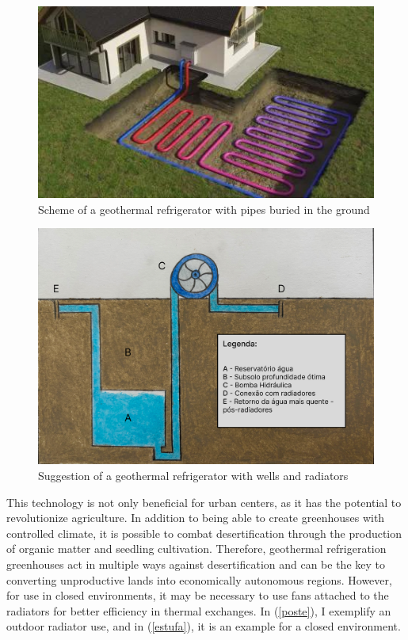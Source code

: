 \begin{figure}[ht]
    \centering
    \includegraphics[scale=0.7]{pictures/geoterma-padrao.jpeg}
    \caption{Scheme of a geothermal refrigerator with pipes buried in the ground}
    \label{geothermal-default}
\end{figure}

\begin{figure}[ht]
    \centering
    \includegraphics[scale=0.25]{pictures/geoterma.png}
    \caption{Suggestion of a geothermal refrigerator with wells and radiators}
    \label{geothermal-new}
\end{figure}

This technology is not only beneficial for urban centers, as it has the potential to revolutionize agriculture. In addition to being able to create greenhouses with controlled climate, it is possible to combat desertification through the production of organic matter and seedling cultivation. Therefore, geothermal refrigeration greenhouses act in multiple ways against desertification and can be the key to converting unproductive lands into economically autonomous regions. However, for use in closed environments, it may be necessary to use fans attached to the radiators for better efficiency in thermal exchanges. In (\autoref{poste}), I exemplify an outdoor radiator use, and in (\autoref{estufa}), it is an example for a closed environment.

